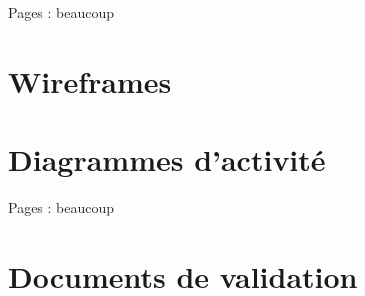 \documentclass{EPL-master-thesis-covers-FR}
\begin{document}
		Pages : beaucoup

	\chapter{Wireframes}
		\label{sec:wireframes}
		

	\chapter{Diagrammes d'activité}

		Pages : beaucoup

	\chapter{Documents de validation}
		\label{sec:documents_validation}
		
	\setlength{\parskip}{0em}
	\backcoverpage
\end{document}
